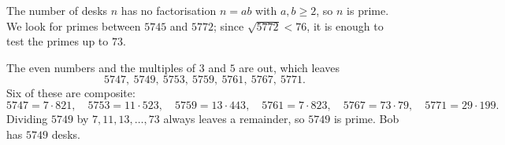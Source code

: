 The number of desks $n$ has no factorisation $n=ab$ with $a,b\ge2$, so $n$ is prime. We look for primes between $5745$ and $5772$; since $\sqrt{5772}<76$, it is enough to test the primes up to $73$.

The even numbers and the multiples of $3$ and $5$ are out, which leaves
\[5747,\ 5749,\ 5753,\ 5759,\ 5761,\ 5767,\ 5771 .\]
Six of these are composite:
\[5747=7\cdot821,\quad5753=11\cdot523,\quad5759=13\cdot443,\quad5761=7\cdot823,\quad5767=73\cdot79,\quad5771=29\cdot199 .\]
Dividing $5749$ by $7,11,13,\ldots,73$ always leaves a remainder, so $5749$ is prime. Bob has $\boxed{5749}$ desks.
